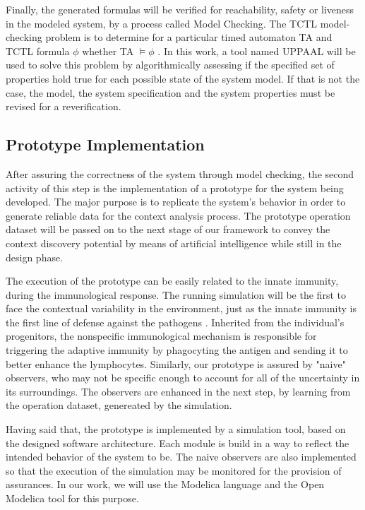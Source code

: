 Finally, the generated formulas will be verified for reachability, safety or liveness in the modeled system, by a process called Model Checking. The TCTL model-checking problem is to determine for a particular timed automaton TA and TCTL formula \(\phi\) whether TA  \(\vDash \phi\) \cite{2008PrinciplesModelChecking}. In this work, a tool named UPPAAL \cite{UPPAAL} will be used to solve this problem by algorithmically assessing if the specified set of properties hold true for each possible state of the system model. If that is not the case, the model, the system specification and the system properties must be revised for a reverification.

\subsection{Prototype Implementation}

After assuring the correctness of the system through model checking, the second activity of this step is the implementation of a prototype for the system being developed. The major purpose is to replicate the system's behavior in order to generate reliable data for the context analysis process. The prototype operation dataset will be passed on to the next stage of our framework to convey the context discovery potential by means of artificial intelligence while still in the design phase.

The execution of the prototype can be easily related to the innate immunity, during the immunological response. The running simulation will be the first to face the contextual variability in the environment, just as the innate immunity is the first line of defense against the pathogens \cite{Kuby2019}. Inherited from the individual's progenitors, the nonspecific immunological mechanism is responsible for triggering the adaptive immunity by phagocyting the antigen and sending it to better enhance the lymphocytes. Similarly, our prototype is assured by "naive" observers, who may not be specific enough to account for all of the uncertainty in its surroundings. The observers are enhanced in the next step, by learning from the operation dataset, genereated by the simulation.

Having said that, the prototype is implemented by a simulation tool, based on the designed software architecture. Each module is build in a way to reflect the intended behavior of the system to be. The naive observers are also implemented so that the execution of the simulation may be monitored for the provision of assurances. In our work, we will use the Modelica language and the Open Modelica tool for this purpose.

